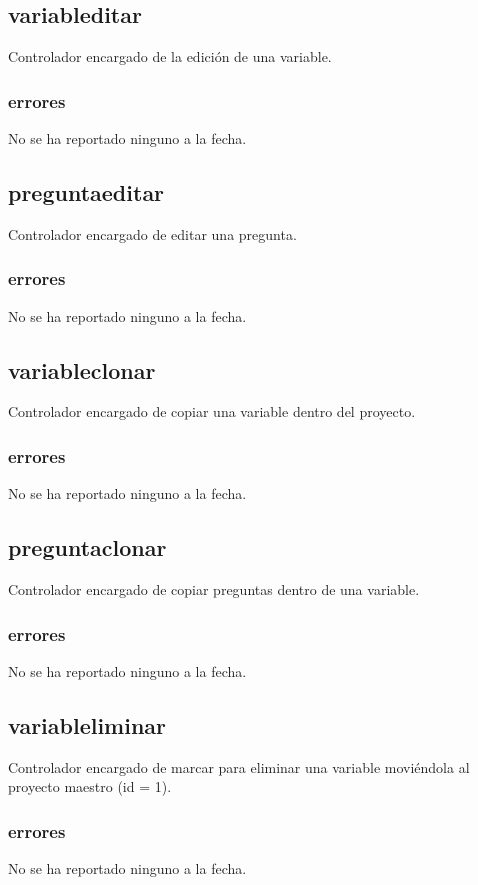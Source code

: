 \documentclass[10pt,a4paper]{book}
\begin{document}
	\subsection{variableditar}
	Controlador encargado de la edición de una variable.
	\subsubsection{errores}
	No se ha reportado ninguno a la fecha.

	\subsection{preguntaeditar}
	Controlador encargado de editar una pregunta.
	\subsubsection{errores}
	No se ha reportado ninguno a la fecha.

	\subsection{variableclonar}
	Controlador encargado de copiar una variable dentro del proyecto.
	\subsubsection{errores}
	No se ha reportado ninguno a la fecha.

	\subsection{preguntaclonar}
	Controlador encargado de copiar preguntas dentro de una variable.
	\subsubsection{errores}
	No se ha reportado ninguno a la fecha.

	\subsection{variableliminar}
	Controlador encargado de marcar para eliminar una variable moviéndola al proyecto maestro (id = 1).
	\subsubsection{errores}
	No se ha reportado ninguno a la fecha.
\end{document}
